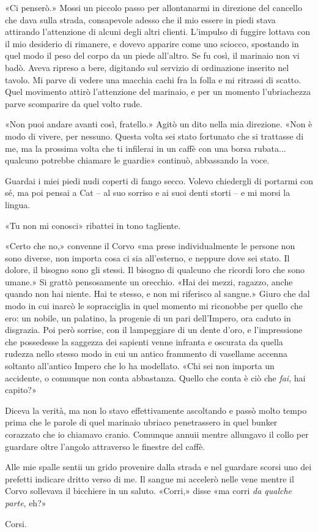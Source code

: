 «Ci penserò.» Mossi un piccolo passo per allontanarmi in direzione del
cancello che dava sulla strada, consapevole adesso che il mio essere in
piedi stava attirando l'attenzione di alcuni degli altri clienti.
L'impulso di fuggire lottava con il mio desiderio di rimanere, e dovevo
apparire come uno sciocco, spostando in quel modo il peso del corpo da
un piede all'altro. Se fu così, il marinaio non vi badò. Aveva ripreso a
bere, digitando sul servizio di ordinazione inserito nel tavolo. Mi
parve di vedere una macchia cachi fra la folla e mi ritrassi di scatto.
Quel movimento attirò l'attenzione del marinaio, e per un momento
l'ubriachezza parve scomparire da quel volto rude.

«Non puoi andare avanti così, fratello.» Agitò un dito nella mia
direzione. «Non è modo di vivere, per nessuno. Questa volta sei stato
fortunato che si trattasse di me, ma la prossima volta che ti infilerai
in un caffè con una borsa rubata... qualcuno potrebbe chiamare le
guardie» continuò, abbassando la voce.

Guardai i miei piedi nudi coperti di fango secco. Volevo chiedergli di
portarmi con sé, ma poi pensai a Cat -- al suo sorriso e ai suoi denti
storti -- e mi morsi la lingua.

«Tu non mi conosci» ribattei in tono tagliente.

«Certo che no,» convenne il Corvo «ma prese individualmente le persone
non sono diverse, non importa cosa ci sia all'esterno, e neppure dove
sei stato. Il dolore, il bisogno sono gli stessi. Il bisogno di qualcuno
che ricordi loro che sono umane.» Si grattò pensosamente un orecchio.
«Hai dei mezzi, ragazzo, anche quando non hai niente. Hai te stesso, e
non mi riferisco al sangue.» Giuro che dal modo in cui inarcò le
sopracciglia in quel momento mi riconobbe per quello che ero: un nobile,
un palatino, la progenie di un pari dell'Impero, ora caduto in
disgrazia. Poi però sorrise, con il lampeggiare di un dente d'oro, e
l'impressione che possedesse la saggezza dei sapienti venne infranta e
oscurata da quella rudezza nello stesso modo in cui un antico frammento
di vasellame accenna soltanto all'antico Impero che lo ha modellato.
«Chi sei non importa un accidente, o comunque non conta abbastanza.
Quello che conta è ciò che \emph{fai}, hai capito?»

Diceva la verità, ma non lo stavo effettivamente ascoltando e passò
molto tempo prima che le parole di quel marinaio ubriaco penetrassero in
quel bunker corazzato che io chiamavo cranio. Comunque annuii mentre
allungavo il collo per guardare oltre l'angolo attraverso le finestre
del caffè.

Alle mie spalle sentii un grido provenire dalla strada e nel guardare
scorsi uno dei prefetti indicare dritto verso di me. Il sangue mi
accelerò nelle vene mentre il Corvo sollevava il bicchiere in un saluto.
«Corri,» disse «ma corri \emph{da qualche parte}, eh?»

Corsi.

